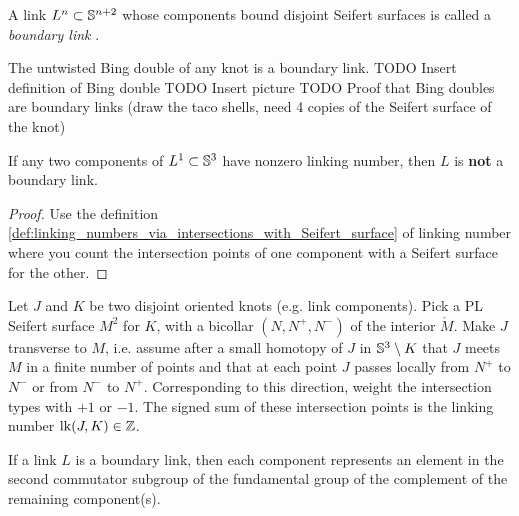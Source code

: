 \begin{definition}
	A link $L^{n} \subset \mathbb{S}^{n+2}$ whose components bound disjoint Seifert surfaces
	is called a \textit{boundary link} .
\end{definition}

\begin{example}
	The untwisted Bing double of any knot is a boundary link.
	TODO Insert definition of Bing double
	TODO Insert picture
	TODO Proof that Bing doubles are boundary links
	(draw the taco shells, need 4 copies of the Seifert surface
	of the knot)
\end{example}

\begin{proposition}
	If any two components of $L^{1} \subset \mathbb{S}^{3}$
	have nonzero linking number, then $L$ is \textbf{not}
	a boundary link.
\end{proposition}

\begin{proof}
	Use the definition \ref{def:linking_numbers_via_intersections_with_Seifert_surface} 
	of linking number where you count
	the intersection points of one component with a Seifert surface for the
	other.
\end{proof}

\begin{definition}
	\label{def:linking_numbers_via_intersections_with_Seifert_surface}
	Let $J$ and $K$ be two disjoint oriented knots (e.g. link components).
	Pick a PL Seifert surface $M^{2}$ for $K$, with
	a bicollar $(N, N^{+}, N^{-})$ of the interior $\mathring{M}$.
	Make $J$ transverse to $M$, i.e. assume after a small
	homotopy of $J$ in $\mathbb{S}^{3} \setminus K$ that
	$J$ meets $M$ in a finite number of points
	and that at each point $J$ passes locally
	from $N^{+}$ to $N^{-}$ or from $N^{-}$ to $N^{+}$.
	Corresponding to this direction, weight the intersection types
	with $+1$ or $-1$.
	The signed sum of these intersection points is the linking
	number $\operatorname{lk}(J, K) \in \mathbb{Z}$.
\end{definition}

\begin{proposition}
	If a link $L$ is a boundary link, then each component
	represents an element
	in the second commutator subgroup
	of the fundamental group of the complement
	of the remaining component(s).
\end{proposition}

